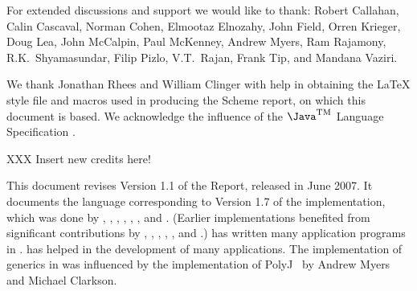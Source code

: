 For extended discussions and support we would like to thank: 
Robert Callahan, Calin
Cascaval, Norman Cohen, Elmootaz Elnozahy, John Field,
Orren Krieger, Doug Lea, John McCalpin, Paul McKenney, Andrew Myers,
Ram Rajamony,
R.K.~Shyamasundar, Filip Pizlo, V.T.~Rajan, Frank Tip, and Mandana Vaziri.

We thank Jonathan Rhees and William Clinger with help in obtaining the
\LaTeX{} style file and macros used in producing the Scheme report,
on which this document is based. We acknowledge the influence of
the $\mbox{\Java}^{\mbox{\textsc{tm}}}$ Language
Specification \cite{jls2}.

XXX Insert new credits here!

This document revises Version 1.1 of the Report, released in
June 2007.  It documents the language corresponding to Version
1.7 of the implementation, which was done by
, 
,  
,  
,
,  
, and
.
(Earlier implementations benefited from significant contributions by
, 
, 
,
,
, and
.)
 has written many application programs
in \Xten{}.  has helped in the
development of many applications.
The implementation of generics in \Xten{} was influenced by the
implementation of PolyJ~\cite{polyj} by Andrew Myers and Michael Clarkson.

